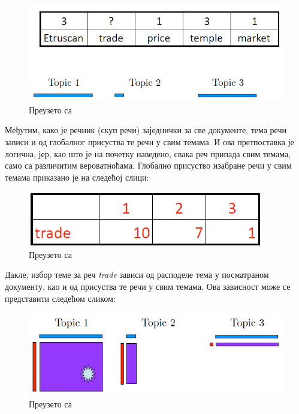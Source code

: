 \begin{figure}[H]
    \centering
   \includegraphics[scale=0.6]{./Slike/slika8.png} 
	\caption{Преузето са \cite{mimno1}}
	\label{fig:slika8}
\end{figure}

Међутим, како је речник (скуп речи) заједнички за све документе, тема речи зависи и од глобалног присуства те речи у свим темама. И ова претпоставка је логична, јер, као што је на почетку наведено, свака реч припада свим темама, само са различитим вероватноћама. Глобално присуство изабране речи у свим темама приказано је на следећој слици: %

\begin{figure}[H]
    \centering
   \includegraphics[scale=0.6]{./Slike/slika9.png} 
	\caption{Преузето са \cite{mimno1}}
	\label{fig:slika9}
\end{figure}


Дакле, избор теме за реч \textit{trade}  зависи од расподеле тема у посматраном документу, као и од присуства те речи у свим темама. Ова зависност може се представити следећом сликом: %

\begin{figure}[H]
    \centering
   \includegraphics[scale=0.6]{./Slike/slika10.png} 
	\caption{Преузето са \cite{mimno1}}
	\label{fig:slika10}
\end{figure}

